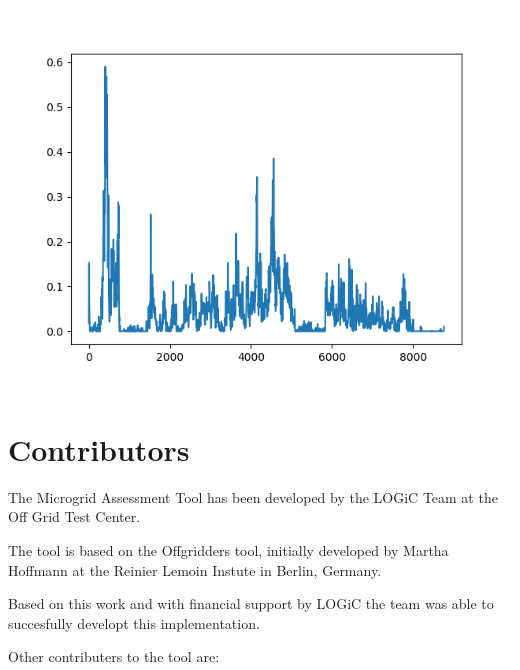 \documentclass{article}[11pt]
\begin{document}
\begin{multicols}{2}





\begin{center}

\includegraphics[width=\linewidth]{per_unit_wind_generation.png}

\end{center}








\end{multicols}\section*{Contributors}\begin{multicols}{2}\setlength{\parindent}{0pt}

The Microgrid Assessment Tool has been developed by the LOGiC Team at the Off Grid Test Center. 

The tool is based on the Offgridders tool, initially developed by Martha Hoffmann at the Reinier Lemoin Instute in Berlin, Germany. 

Based on this work and with financial support by LOGiC the team was able to succesfully developt this implementation. 

Other contributers to the tool are: 


\end{multicols}
\end{document}
